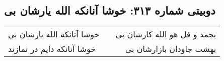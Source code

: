 \begin{center}
\section*{دوبیتی شماره ۳۱۳: خوشا آنانکه الله یارشان بی}
\label{sec:313}
\begin{longtable}{l p{0.5cm} r}
خوشا آنانکه الله یارشان بی
&&
بحمد و قل هو الله کارشان بی
\\
خوشا آنانکه دایم در نمازند
&&
بهشت جاودان بازارشان بی
\\
\end{longtable}
\end{center}
